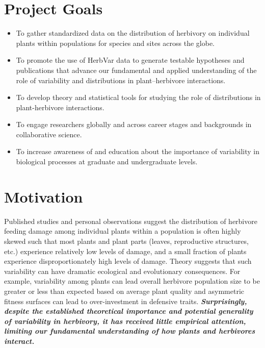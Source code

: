 \documentclass[
  letterpaper,
  oneside,
  open=any]{scrbook}
\providecommand{\tightlist}{%
  \setlength{\itemsep}{0pt}\setlength{\parskip}{0pt}}\usepackage{longtable,booktabs,array}
\begin{document}
\section{Project Goals}\label{project-goals}

\begin{itemize}
\tightlist
\item
  To gather standardized data on the distribution of herbivory on
  individual plants within populations for species and sites across the
  globe.
\item
  To promote the use of HerbVar data to generate testable hypotheses and
  publications that advance our fundamental and applied understanding of
  the role of variability and distributions in plant--herbivore
  interactions.
\item
  To develop theory and statistical tools for studying the role of
  distributions in plant-herbivore interactions.
\item
  To engage researchers globally and across career stages and
  backgrounds in collaborative science.
\item
  To increase awareness of and education about the importance of
  variability in biological processes at graduate and undergraduate
  levels.
\end{itemize}

\section{Motivation}\label{motivation}

Published studies and personal observations suggest the distribution of
herbivore feeding damage among individual plants within a population is
often highly skewed such that most plants and plant parts (leaves,
reproductive structures, etc.) experience relatively low levels of
damage, and a small fraction of plants experience disproportionately
high levels of damage. Theory suggests that such variability can have
dramatic ecological and evolutionary consequences. For example,
variability among plants can lead overall herbivore population size to
be greater or less than expected based on average plant quality and
asymmetric fitness surfaces can lead to over-investment in defensive
traits. \textbf{\emph{Surprisingly, despite the established theoretical
importance and potential generality of variability in herbivory, it has
received little empirical attention, limiting our fundamental
understanding of how plants and herbivores interact.}}
\end{document}
